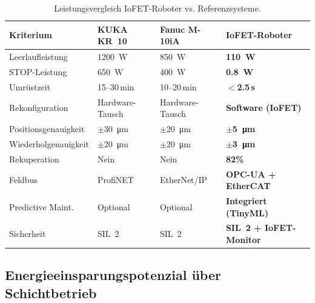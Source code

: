 ﻿\documentclass[a4paper,12pt]{scrreprt}
\theoremstyle{definition}
\begin{document}
\begin{table}[H]
\centering
\caption{Leistungsvergleich IoFET-Roboter vs. Referenzsysteme.}
\label{tab:compare}
\small
\begin{tabularx}{\linewidth}{|l|X|X|X|}
\hline
\rowcolor{iofetblue!25}
\textbf{Kriterium} & \textbf{KUKA KR~10} & \textbf{Fanuc M-10iA} & \textbf{IoFET-Roboter} \\
\hline
Leerlaufleistung & \SI{1200}{\watt} & \SI{850}{\watt} & \textbf{\SI{110}{\watt}} \\
\hline
STOP-Leistung & \SI{650}{\watt} & \SI{400}{\watt} & \textbf{\SI{0.8}{\watt}} \\
\hline
Umrüstzeit & 15--30\,min & 10--20\,min & \textbf{$<$2.5\,s} \\
\hline
Rekonfiguration & Hardware-Tausch & Hardware-Tausch & \textbf{Software (IoFET)} \\
\hline
Positionsgenauigkeit & $\pm$\SI{30}{\micro\meter} & $\pm$\SI{20}{\micro\meter} & \textbf{$\pm$\SI{5}{\micro\meter}} \\
\hline
Wiederholgenauigkeit & $\pm$\SI{20}{\micro\meter} & $\pm$\SI{20}{\micro\meter} & \textbf{$\pm$\SI{3}{\micro\meter}} \\
\hline
Rekuperation & Nein & Nein & \textbf{82\%} \\
\hline
Feldbus & ProfiNET & EtherNet/IP & \textbf{OPC-UA + EtherCAT} \\
\hline
Predictive Maint. & Optional & Optional & \textbf{Integriert (TinyML)} \\
\hline
Sicherheit & SIL~2 & SIL~2 & \textbf{SIL~2 + IoFET-Monitor} \\
\hline
\end{tabularx}
\end{table}

\subsection{Energieeinsparungspotenzial über Schichtbetrieb}
\end{document}
